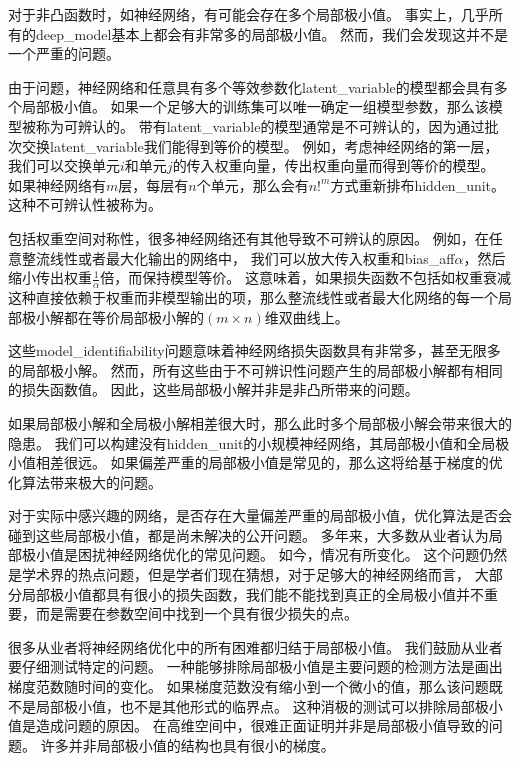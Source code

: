 
对于非凸函数时，如神经网络，有可能会存在多个局部极小值。
事实上，几乎所有的\gls{deep_model}基本上都会有非常多的局部极小值。
然而，我们会发现这并不是一个严重的问题。

由于问题，神经网络和任意具有多个等效参数化\gls{latent_variable}的模型都会具有多个局部极小值。
如果一个足够大的训练集可以唯一确定一组模型参数，那么该模型被称为可辨认的。
带有\gls{latent_variable}的模型通常是不可辨认的，因为通过批次交换\gls{latent_variable}我们能得到等价的模型。
例如，考虑神经网络的第一层，我们可以交换单元$i$和单元$j$的传入权重向量，传出权重向量而得到等价的模型。
如果神经网络有$m$层，每层有$n$个单元，那么会有$n!^m$方式重新排布\gls{hidden_unit}。
这种不可辨认性被称为。

包括权重空间对称性，很多神经网络还有其他导致不可辨认的原因。
例如，在任意整流线性或者最大化输出的网络中，
我们可以放大传入权重和\gls{bias_aff}$\alpha$，然后缩小传出权重$\frac{1}{\alpha}$倍，而保持模型等价。
这意味着，如果损失函数不包括如权重衰减这种直接依赖于权重而非模型输出的项，那么整流线性或者最大化网络的每一个局部极小解都在等价局部极小解的$(m\times n)$维双曲线上。

这些\gls{model_identifiability}问题意味着神经网络损失函数具有非常多，甚至无限多的局部极小解。
然而，所有这些由于不可辨识性问题产生的局部极小解都有相同的损失函数值。
因此，这些局部极小解并非是非凸所带来的问题。

如果局部极小解和全局极小解相差很大时，那么此时多个局部极小解会带来很大的隐患。
我们可以构建没有\gls{hidden_unit}的小规模神经网络，其局部极小值和全局极小值相差很远\citep{Sontag-cs89,Brady89,Gori-pami91}。
如果偏差严重的局部极小值是常见的，那么这将给基于梯度的优化算法带来极大的问题。


对于实际中感兴趣的网络，是否存在大量偏差严重的局部极小值，优化算法是否会碰到这些局部极小值，都是尚未解决的公开问题。
多年来，大多数从业者认为局部极小值是困扰神经网络优化的常见问题。
如今，情况有所变化。
这个问题仍然是学术界的热点问题，但是学者们现在猜想，对于足够大的神经网络而言，
大部分局部极小值都具有很小的损失函数，我们能不能找到真正的全局极小值并不重要，而是需要在参数空间中找到一个具有很少损失的点\citep{Saxe-et-al-ICLR13,Dauphin-et-al-NIPS2014-small,GoodfellowOptimization15,Choromanska-et-al-AISTATS2015}。

很多从业者将神经网络优化中的所有困难都归结于局部极小值。
我们鼓励从业者要仔细测试特定的问题。
一种能够排除局部极小值是主要问题的检测方法是画出梯度范数随时间的变化。
如果梯度范数没有缩小到一个微小的值，那么该问题既不是局部极小值，也不是其他形式的临界点。
这种消极的测试可以排除局部极小值是造成问题的原因。
在高维空间中，很难正面证明并非是局部极小值导致的问题。
许多并非局部极小值的结构也具有很小的梯度。

